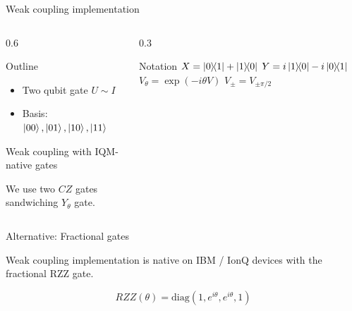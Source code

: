 \documentclass{beamer}
\begin{document}
	\begin{frame}{Weak coupling implementation}
		\vspace{-0.2cm}
		
		\begin{columns}
			
			\begin{column}{0.6\textwidth}
		
				\begin{block}{Outline}
					\begin{itemize}
						\item Two qubit gate $U\sim I$
						\item Basis: $\ket{00}, \ket{01}, \ket{10}, \ket{11}$
					\end{itemize}	
				\end{block}
			
				\begin{block}{Weak coupling with IQM-native gates}
					
					We use two $CZ$ gates sandwiching $Y_\theta$ gate.
					
					\begin{figure}	
					\end{figure}
				\end{block}

		
	
			\end{column}
		
			\begin{column}{0.3\textwidth}
				\begin{block}{Notation}
					$ X = \ketbra{0}{1} + \ketbra{1}{0}$
					$ Y = i \ketbra{1}{0} - i \ketbra{0}{1}$
					$ V_\theta = \exp(-i\theta V)$
					$ V_\pm = V_{\pm\pi/2}$		
				\end{block}
			\end{column}
			
		
		\end{columns}
	
		\begin{block}{Alternative: Fractional gates}
			
			Weak coupling implementation is native on IBM / IonQ devices with
			the fractional RZZ gate.
			
			$$
				RZZ(\theta) = \mathrm{diag}(1, e^{i\theta}, e^{i\theta}, 1)
			$$
			
		\end{block}
		
	\end{frame}
\end{document}
